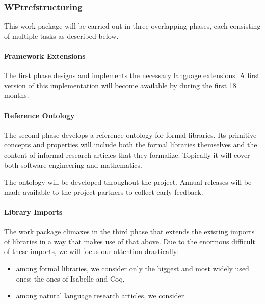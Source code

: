 \subsubsection{WPtref{structuring}}

This work package will be carried out in three overlapping phases, each consisting of multiple tasks as described below.


\paragraph{Framework Extensions}
The first phase designs and implements the necessary language extensions.
A first version of this implementation will become available by during the first 18 months.



\paragraph{Reference Ontology}
The second phase develops a reference ontology for formal libraries.
Its primitive concepts and properties will include both the formal libraries themselves and the content of informal research articles that they formalize.
Topically it will cover both software engineering and mathematics.

The ontology will be developed throughout the project.
Annual releases will be made available to the project partners to collect early feedback.

\paragraph{Library Imports}
The work package climaxes in the third phase that extends the existing imports of libraries in a way that makes use of that above.
Due to the enormous difficult of these imports, we will focus our attention drastically:
\begin{itemize}
  \item among formal libraries, we consider only the biggest and most widely used ones: the ones of Isabelle and Coq,
  \item among natural language research articles, we consider    
\end{itemize}

